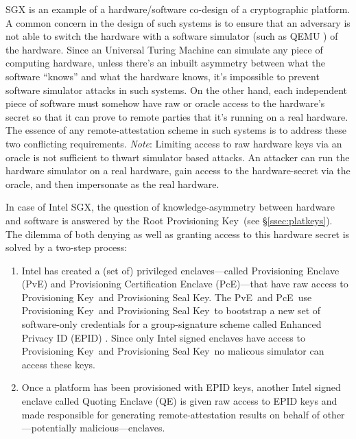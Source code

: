 \documentclass[letterpaper]{article}
\newcommand{\secref}[1]{\S\ref{#1}}
\newcommand{\pve}{\textsf{PvE}}
\newcommand{\pce}{\textsf{PcE}}
\newcommand{\qe}{\textsf{QE}}
\newcommand{\rpk}{\textsf{Root Provisioning Key}}
\newcommand{\pk}{\textsf{Provisioning Key}}
\newcommand{\psk}{\textsf{Provisioning Seal Key}}
\begin{document}
  SGX is an example of a hardware/software co-design of a
  cryptographic platform. A common concern in the design of such
  systems is to ensure that an adversary is not able to switch the
  hardware with a software simulator (such as QEMU \cite{qemu,
    opensgx}) of the hardware. Since an Universal Turing Machine can
  simulate any piece of computing hardware, unless there's an inbuilt
  asymmetry between what the software ``knows'' and what the hardware
  knows, it's impossible to prevent software simulator attacks in such
  systems. On the other hand, each independent piece of software must
  somehow have raw or oracle access to the hardware's secret so that
  it can prove to remote parties that it's running on a real
  hardware. The essence of any remote-attestation scheme in such
  systems is to address these two conflicting requirements. {\em
    Note}: Limiting access to raw hardware keys via an oracle is not
  sufficient to thwart simulator based attacks. An attacker can run
  the hardware simulator on a real hardware, gain access to the
  hardware-secret via the oracle, and then impersonate as the real
  hardware.

  In case of Intel SGX, the question of knowledge-asymmetry between
  hardware and software is answered by the \rpk\ (see
  \secref{ssec:platkeys}). The dilemma of both denying as well as
  granting access to this hardware secret is solved by a two-step
  process:

  \begin{enumerate}
    \item Intel has created a (set of) privileged enclaves---called
      \textsf{Provisioning Enclave} (\pve) and \textsf{Provisioning
        Certification Enclave} (\pce)---that have raw access to
      \pk\ and \psk. The \pve\ and \pce\ use \pk\ and \psk\ to
      bootstrap a new set of software-only credentials for a
      group-signature scheme called Enhanced Privacy ID (EPID)
      \cite{epid}. Since only Intel signed enclaves have access to
      \pk\ and \psk\ no malicous simulator can access these keys.

    \item Once a platform has been provisioned with EPID keys, another
      Intel signed enclave called \textsf{Quoting Enclave} (\qe) is
      given raw access to EPID keys and made responsible for
      generating remote-attestation results on behalf of
      other---potentially malicious---enclaves.

  \end{enumerate}
\end{document}
